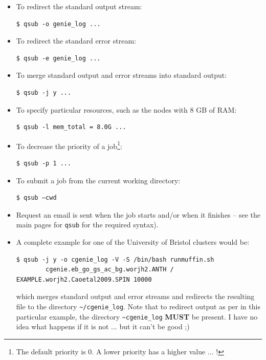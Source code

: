 \documentclass[11pt,fleqn]{book} %
\begin{document}
\begin{itemize}[noitemsep]
\setlength{\itemindent}{.2in}

        \item To redirect the standard output stream:
        \vspace{-2pt}\begin{verbatim}$ qsub -o genie_log ...\end{verbatim}
        
        \item To redirect the standard error stream:
        \vspace{-2pt}\begin{verbatim}$ qsub -e genie_log ...\end{verbatim}
        
        \item To merge standard output and error streams into standard output:
        \vspace{-2pt}\begin{verbatim}$ qsub -j y ...\end{verbatim}
        
        \item To specify particular resources, such as the nodes with 8 GB of RAM:
        \vspace{-2pt}\begin{verbatim}$ qsub -l mem_total = 8.0G ...\end{verbatim}
        
        \item To decrease the priority of a job\footnote{The default priority is 0. A lower priority has a higher value ... !}:
        \vspace{-2pt}\begin{verbatim}$ qsub -p 1 ...\end{verbatim}
        
        \item To submit a job from the current working directory:
        \vspace{-2pt}\begin{verbatim}$ qsub –cwd\end{verbatim}
        
        \item Request an email is sent when the job starts and/or when it finishes -- see the main pages for \texttt{qsub} for the required syntax).
        
        \item A complete example for one of the University of Bristol clusters would be:
        \vspace{-2pt}\begin{verbatim}$ qsub -j y -o cgenie_log -V -S /bin/bash runmuffin.sh
        cgenie.eb_go_gs_ac_bg.worjh2.ANTH / EXAMPLE.worjh2.Caoetal2009.SPIN 10000\end{verbatim}
        which merges standard output and error streams and redirects the resulting file to the directory \texttt{\~{}/cgenie\_log}.
        Note that to redirect output as per in this particular example, the directory \texttt{\~{}cgenie\_log} \textbf{MUST} be present. I have no idea what happens if it is not ... but it can't be good ;)
        

\end{itemize}
\end{document}
